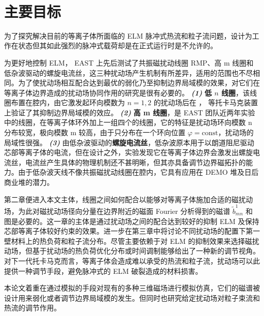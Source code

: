 

​\section{主要目标}
为了探究解决目前的\Hmode 等离子体所面临的 ELM 脉冲式热流和粒子流问题，\iter 设计为工作在\Hmode 状态但其如此强烈的脉冲式载荷却是在正式运行时是不允许的。

为更好地控制 ELM， EAST 上先后测试了共振磁扰动线圈 RMP、高 m 线圈和低杂波驱动的螺旋电流丝，这三种扰动场产生机制有所差异，适用的范围也不尽相同。为了使扰动场相互配合达到最优的弱化乃至抑制边界局域模的效果，对它们在等离子体边界造成的扰动场协同作用的研究是很有必要的。 \textit{\textbf{(1)}} \textbf{低 $n$ 线圈}，该线圈布置在腔内，由它激发起环向模数为 $n=1,2$ 的扰动场后在 \east， \ddd 等托卡马克装置上验证了其抑制边界局域模的效应。 \textit{\textbf{(2)}} \textbf{高 m 线圈}，是 EAST 团队近两年实验中的线圈，在等离子体环外加上一组四个的线圈，它的特征是扰动场环向模数 n 分布较宽，极向模数 m 较高，由于只分布在一个环向位置 $\varphi=\text{const}$，扰动场的局域性很强。 \textit{\textbf{(3)}} 由低杂波驱动的\textbf{螺旋电流丝}，低杂波原本用于以朗道阻尼驱动芯部等离子体的电流，但在设计之外，实验发现它在等离子体边界会激发出螺旋电流丝，电流丝产生具体的物理机制还不甚明晰，但其亦具备调节边界磁拓扑的能力。由于低杂波天线不像共振磁扰动线圈在腔内，它具有应用在 DEMO 堆及日后商业堆的潜力。

第二章便进入本文主体，线圈之间如何配合以能够对等离子体施加合适的磁扰动场，为此对磁扰动场径向分量在边界附近的磁面 Fourier 分析得到的磁谱 $\tilde{b}^1_{mn}$ 和 \Poincare 图是必要的。这一章的主体是通过扰动场之间的配合达到较好的抑制 ELM 及保持芯部等离子体较好约束的效果。进一步在第三章中将讨论不同扰动场的配置下第一壁材料上的热负荷和粒子流分布。尽管主要依赖于对 ELM 的抑制效果来选择磁扰动场，但基于扰动场的热负荷优化分布或时间调制能够给出了一种新的调节视角。对下一代托卡马克而言，\Hmode 等离子体会造成难以承受的热流和粒子流，扰动场可以此提供一种调节手段，避免脉冲式的 ELM 破裂造成的材料损害。

本论文着重在通过模拟的手段对现有的多种三维磁场进行模拟仿真，它们的磁谱被设计用来弱化或者调节边界局域模的发生。但同时也研究给定扰动场对粒子束流和热流的调节作用。
